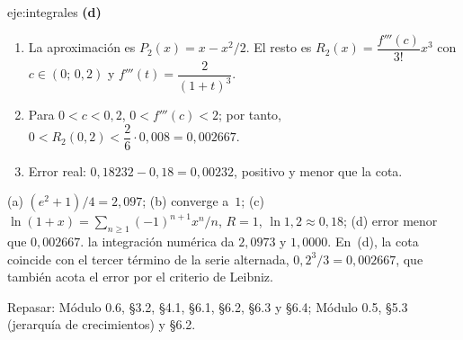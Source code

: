 \begin{solucion}{eje:integrales}
\noindent\textbf{(d)}
\begin{enumerate}[label=\arabic*.]
  \item La aproximación es $P_2(x)=x-x^{2}/2$. El resto es $R_2(x)=\dfrac{f'''(c)}{3!}x^{3}$ con $c\in(0;\,0{,}2)$ y $f'''(t)=\dfrac{2}{(1+t)^{3}}$.
  \item Para $0<c<0{,}2$, $0<f'''(c)<2$; por tanto, $0<R_2(0{,}2)<\dfrac{2}{6}\cdot0{,}008=0{,}002667$.
  \item Error real: $0{,}18232-0{,}18=0{,}00232$, positivo y menor que la cota.
\end{enumerate}
\resultado (a) $(e^{2}+1)/4=2{,}097$; (b) converge a~$1$; (c) $\ln(1+x)=\sum_{n\ge1}(-1)^{n+1}x^{n}/n$, $R=1$, $\ln1{,}2\approx0{,}18$; (d) error menor que $0{,}002667$.
\comprobacion la integración numérica da $2{,}0973$ y $1{,}0000$. En~(d), la cota coincide con el tercer término de la serie alternada, $0{,}2^{3}/3=0{,}002667$, que también acota el error por el criterio de Leibniz.


\noindent Repasar: Módulo 0.6, §3.2, §4.1, §6.1, §6.2, §6.3 y §6.4; Módulo 0.5, §5.3 (jerarquía de crecimientos) y §6.2.
\end{solucion}

